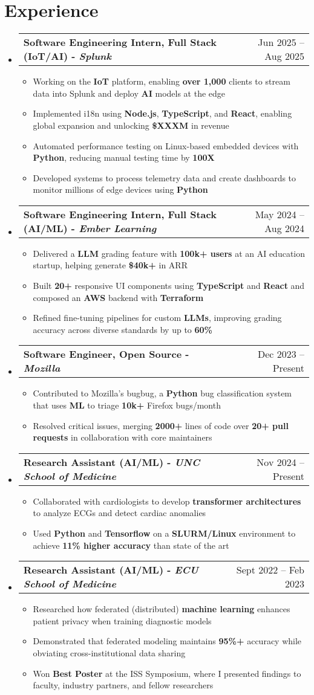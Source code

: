 \documentclass[letterpaper,11pt]{article}
\makeatletter
\newcommand{\resumeItem}[1]{
  \item\small{
    {#1 \vspace{-2pt}}}
}
\newcommand{\resumeSubheading}[2]{
  \vspace{-2pt}\item
    \begin{tabular*}{0.97\textwidth}[t]{l@{\extracolsep{\fill}}r}
      \textbf{#1} & #2 \\
    \end{tabular*}
    \vspace{-7pt}
}
\newcommand{\resumeSubHeadingListStart}{\begin{itemize}[leftmargin=0.15in, label={}]}
\newcommand{\resumeSubHeadingListEnd}{\end{itemize}}
\newcommand{\resumeItemListStart}{\begin{itemize}[leftmargin=0.15in]}
\newcommand{\resumeItemListEnd}{\end{itemize}\vspace{-5pt}}
\makeatother
\begin{document}
\section{Experience}
  \resumeSubHeadingListStart
  \resumeSubheading
  {\textbf{ Software Engineering Intern, Full Stack (IoT/AI)} - \textit{Splunk}}{Jun 2025 -- Aug 2025}
  \resumeItemListStart
    \resumeItem{Working on the \textbf{IoT} platform, enabling \textbf{over 1,000} clients to stream data into Splunk and deploy \textbf{AI} models at the edge}
    \resumeItem{Implemented i18n using \textbf{Node.js}, \textbf{TypeScript}, and \textbf{React}, enabling global expansion and unlocking \textbf{\$XXXM} in revenue}
    \resumeItem{Automated performance testing on Linux-based embedded devices with \textbf{Python}, reducing manual testing time by \textbf{100X}}
    \resumeItem{Developed systems to process telemetry data and create dashboards to monitor millions of edge devices using \textbf{Python}}
  \resumeItemListEnd
  \resumeSubheading
      {\textbf{Software Engineering Intern, Full Stack (AI/ML)} - \textit{Ember Learning}}{May 2024 -- Aug 2024}
      \resumeItemListStart
        \resumeItem{Delivered a \textbf{LLM} grading feature with \textbf{100k+ users} at an AI education startup, helping generate \textbf{\$40k+} in ARR}
        \resumeItem{Built \textbf{20+} responsive UI components using \textbf{TypeScript} and \textbf{React} and composed an \textbf{AWS} backend with \textbf{Terraform}}
        \resumeItem{Refined fine-tuning pipelines for custom \textbf{LLMs}, improving grading accuracy across diverse standards by up to \textbf{60\%}}
      \resumeItemListEnd
      \resumeSubheading
      {\textbf{Software Engineer, Open Source} - \textit{Mozilla}}{Dec 2023 -- Present}
      \resumeItemListStart
        \resumeItem{Contributed to Mozilla's bugbug, a \textbf{Python} bug classification system that uses \textbf{ML} to triage \textbf{10k+} Firefox bugs/month} 
        \resumeItem{Resolved critical issues, merging \textbf{2000+} lines of code over \textbf{20+ pull requests} in collaboration with core maintainers}
      \resumeItemListEnd
      \resumeSubheading
      {\textbf{Research Assistant (AI/ML)} - \textit{UNC School of Medicine}}{ Nov 2024 -- Present}
      \resumeItemListStart
        \resumeItem{Collaborated with cardiologists to develop \textbf{transformer architectures} to analyze ECGs and detect cardiac anomalies}
        \resumeItem{Used \textbf{Python} and \textbf{Tensorflow} on a \textbf{SLURM/Linux} environment to achieve \textbf{11\% higher accuracy} than state of the art}
      \resumeItemListEnd
      \resumeSubheading
      {\textbf{Research Assistant (AI/ML)} - \textit{ECU School of Medicine}}{Sept 2022 -- Feb 2023}
      \resumeItemListStart
        \resumeItem{Researched how federated (distributed) \textbf{machine learning} enhances patient privacy when training diagnostic models}
        \resumeItem{Demonstrated that federated modeling maintains \textbf{95\%+} accuracy while obviating cross-institutional data sharing}
        \resumeItem{Won \textbf{Best Poster} at the ISS Symposium, where I presented findings to faculty, industry partners, and fellow researchers}
      \resumeItemListEnd
  \resumeSubHeadingListEnd
\end{document}
